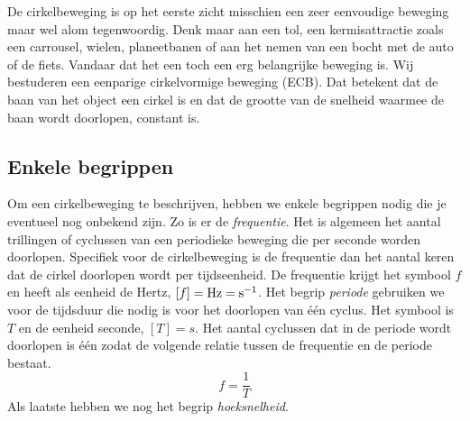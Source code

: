 \documentclass{ximera}
\begin{document}
	\author{Bart Lambregs}
    \xmsource\xmuitleg

De cirkelbeweging is op het eerste zicht misschien een zeer eenvoudige beweging maar wel alom tegenwoordig. Denk maar aan een tol, een kermisattractie zoals een carrousel, wielen, planeetbanen of aan het nemen van een bocht met de auto of de fiets. Vandaar dat het een toch een erg belangrijke beweging is. Wij bestuderen een eenparige cirkelvormige beweging (ECB). Dat betekent dat de baan van het object een cirkel is en dat de grootte van de snelheid waarmee de baan wordt doorlopen, constant is.

\subsection{Enkele begrippen}

Om een cirkelbeweging te beschrijven, hebben we enkele begrippen nodig die je eventueel nog onbekend zijn. Zo is er de \emph{frequentie}. Het is algemeen het aantal trillingen of cyclussen van een periodieke beweging die per seconde worden doorlopen. Specifiek voor de cirkelbeweging is de frequentie dan het aantal keren dat de cirkel doorlopen wordt per tijdseenheid. De frequentie krijgt het symbool $f$ en heeft als eenheid de Hertz, $[f]=\rm Hz=s^{-1}$. Het begrip \emph{periode} gebruiken we voor de tijdsduur die nodig is voor het doorlopen van \'e\'en cyclus. Het symbool is $T$ en de eenheid seconde, $[T]=s$. Het aantal cyclussen dat in de periode wordt doorlopen is \'e\'en zodat de volgende relatie tussen de frequentie en de periode bestaat.
\begin{equation*}
	f=\frac{1}{T}
\end{equation*}
Als laatste hebben we nog het begrip \textit{hoeksnelheid}. 
\end{document}

